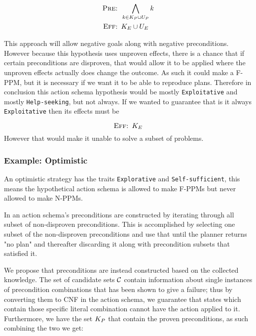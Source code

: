 \documentclass[\master/Master.tex]{subfiles}
\begin{document}
\begin{equation}
    \begin{split}			
        \textsc{Pre: } & \bigwedge\limits_{k \in K_P \cup U_P} k \\
        \textsc{Eff: } &  K_E \cup U_E
    \end{split}
\end{equation}

This approach will allow negative goals along with negative preconditions. 
However because this hypothesis uses unproven effects, there is a chance that if certain preconditions are disproven, that would allow it to be applied where the unproven effects actually does change the outcome.
As such it could make a F-PPM, but it is necessary if we want it to be able to reproduce plans. 
Therefore in conclusion this action schema hypothesis would be mostly \texttt{Exploitative} and mostly \texttt{Help-seeking}, but not always.
If we wanted to guarantee that is it always \texttt{Exploitative} then  its effects must be

	\begin{equation}
	\textsc{Eff: }  K_E 
	\end{equation}
	However that would make it unable to solve a subset of problems.

\subsubsection{Example: Optimistic} 

	An optimistic strategy has the traits \texttt{Explorative} and \texttt{Self-sufficient},
	this means the hypothetical action schema is allowed to make F-PPMs but never allowed to make N-PPMs.

	In \cite{Walsh2008} an action schema's preconditions are constructed by iterating through all subset of non-disproven preconditions.
	This is accomplished by selecting one subset of the non-disproven preconditions and use that until the planner returns "no plan" and thereafter discarding it along with precondition subsets that satisfied it.

	We propose that preconditions are instead constructed based on the collected knowledge.
	The set of candidate sets $\mathcal{C}$ contain information about single instances of precondition combinations that has been shown to give a failure;
	thus by converting them to CNF in the action schema, we guarantee that states which contain those specific literal combination cannot have the action applied to it.
	Furthermore, we have the set $K_P$ that contain the proven preconditions, as such combining the two we get:
\end{document}
